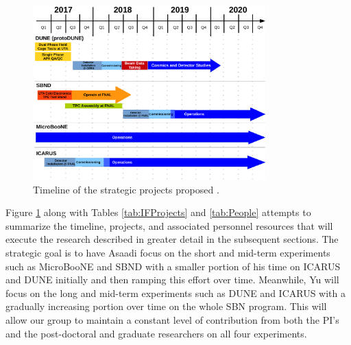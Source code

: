 \begin{figure}[htb]
\centering
\includegraphics[width=0.80\textwidth]{images/Timeline.pdf}
\caption[]{Timeline of the strategic projects proposed .}
\label{fig:IFTimeline}
\end{figure}

Figure \ref{fig:IFTimeline} along with Tables \ref{tab:IFProjects} and \ref{tab:People} attempts to summarize the timeline, projects, and associated personnel resources that will execute the research described in greater detail in the subsequent sections. The strategic goal is to have Asaadi focus on the short and mid-term experiments such as MicroBooNE and SBND with a smaller portion of his time on ICARUS and DUNE initially and then ramping this effort over time. Meanwhile, Yu will focus on the long and mid-term experiments such as DUNE and ICARUS with a gradually increasing portion over time on the whole SBN program. This will allow our group to maintain a constant level of contribution from both the PI's and the post-doctoral and graduate researchers on all four experiments.

